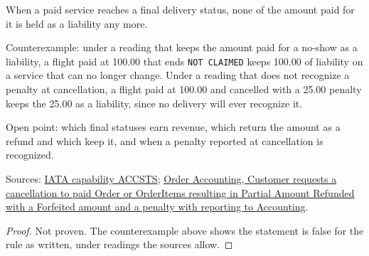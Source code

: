 \begin{theorem}
  \label{thm:accounting-final-no-liability}
  When a paid service reaches a final delivery status, none of the amount
  paid for it is held as a liability any more.

  Counterexample: under a reading that keeps the amount paid for a no-show
  as a liability, a flight paid at 100.00 that ends \texttt{NOT CLAIMED}
  keeps 100.00 of liability on a service that can no longer change.  Under
  a reading that does not recognize a penalty at cancellation, a flight
  paid at 100.00 and cancelled with a 25.00 penalty keeps the 25.00 as a
  liability, since no delivery will ever recognize it.

  Open point: which final statuses earn revenue, which return the amount
  as a refund and which keep it, and when a penalty reported at
  cancellation is recognized.

  Sources: \href{https://retailing.iata.org/armi/docs/ACCSTS/}{IATA capability ACCSTS};
  \href{https://standards.atlassian.net/wiki/spaces/OA/pages/844333143}{Order Accounting, Customer requests a cancellation to paid Order or OrderItems resulting in Partial Amount Refunded with a Forfeited amount and a penalty with reporting to Accounting}.
\end{theorem}
\begin{proof}
  Not proven.  The counterexample above shows the statement is false for
  the rule as written, under readings the sources allow.
\end{proof}

